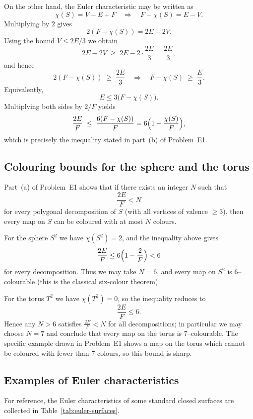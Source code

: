\documentclass[12pt,a4paper]{article}
\theoremstyle{plain}
\theoremstyle{definition}      %
\begin{document}
	On the other hand, the Euler characteristic may be written as
	\[
	\chi(S) = V - E + F
	\quad\Longrightarrow\quad
	F - \chi(S) = E - V.
	\]
	Multiplying by $2$ gives
	\[
	2(F - \chi(S)) = 2E - 2V.
	\]
	Using the bound $V \le 2E/3$ we obtain
	\[
	2E - 2V \;\ge\; 2E - 2\cdot\frac{2E}{3}
	= \frac{2E}{3},
	\]
	and hence
	\[
	2(F - \chi(S)) \;\ge\; \frac{2E}{3}
	\quad\Longrightarrow\quad
	F - \chi(S) \;\ge\; \frac{E}{3}.
	\]
	Equivalently,
	\[
	E \le 3\bigl(F - \chi(S)\bigr).
	\]
	Multiplying both sides by $2/F$ yields
	\[
	\frac{2E}{F} \;\le\;
	\frac{6(F - \chi(S))}{F}
	= 6\Bigl(1 - \frac{\chi(S)}{F}\Bigr),
	\]
	which is precisely the inequality stated in part~(b) of Problem~E1.
	
	\subsection*{Colouring bounds for the sphere and the torus}
	
	Part~(a) of Problem~E1 shows that if there exists an integer $N$ such that
	\[
	\frac{2E}{F} < N
	\]
	for every polygonal decomposition of $S$ (with all vertices of valence
	$\ge 3$), then every map on $S$ can be coloured with at most $N$ colours.
	
	For the sphere $S^2$ we have $\chi(S^2)=2$, and the inequality above
	gives
	\[
	\frac{2E}{F} \le 6\Bigl(1 - \frac{2}{F}\Bigr) < 6
	\]
	for every decomposition.  Thus we may take $N=6$, and every map on $S^2$
	is $6$--colourable (this is the classical six-colour theorem).
	
	For the torus $T^2$ we have $\chi(T^2)=0$, so the inequality reduces to
	\[
	\frac{2E}{F} \le 6.
	\]
	Hence any $N>6$ satisfies $\frac{2E}{F} < N$ for all decompositions; in
	particular we may choose $N=7$ and conclude that every map on the torus is
	$7$--colourable.  The specific example drawn in Problem~E1 shows a map on
	the torus which cannot be coloured with fewer than $7$ colours, so this
	bound is sharp.
	
	\clearpage
	
	\subsection*{Examples of Euler characteristics}
	
	For reference, the Euler characteristics of some standard closed surfaces
	are collected in Table~\ref{tab:euler-surfaces}.
	
\end{document}
